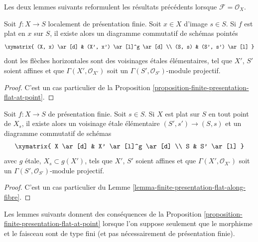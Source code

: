 \noindent
Les deux lemmes suivants reformulent les résultats
précédents lorsque $\mathcal{F} = \mathcal{O}_X$.

\begin{lemma}
\label{lemma-finite-presentation-flat-at-point-X}
Soit $f : X \to S$ localement de présentation finie.
Soit $x \in X$ d'image $s \in S$.
Si $f$ est plat en $x$ sur $S$, il existe alors un diagramme commutatif
de schémas pointés
$$
\xymatrix{
(X, x) \ar[d] & (X', x') \ar[l]^g \ar[d] \\
(S, s) & (S', s') \ar[l]
}
$$
dont les flèches horizontales sont des voisinages \'etales élémentaires,
tel que $X'$, $S'$ soient affines et que
$\Gamma(X', \mathcal{O}_{X'})$ soit un
$\Gamma(S', \mathcal{O}_{S'})$-module projectif.
\end{lemma}

\begin{proof}
C'est un cas particulier de la
Proposition \ref{proposition-finite-presentation-flat-at-point}.
\end{proof}

\begin{lemma}
\label{lemma-finite-presentation-flat-along-fibre-X}
Soit $f : X \to S$ de présentation finie.
Soit $s \in S$.
Si $X$ est plat sur $S$ en tout point de $X_s$,
il existe alors un voisinage \'etale élémentaire
$(S', s') \to (S, s)$ et un diagramme commutatif de schémas
$$
\xymatrix{
X \ar[d] & X' \ar[l]^g \ar[d] \\
S & S' \ar[l]
}
$$
avec $g$ \'etale, $X_s \subset g(X')$, tels que $X'$, $S'$
soient affines et que
$\Gamma(X', \mathcal{O}_{X'})$ soit un
$\Gamma(S', \mathcal{O}_{S'})$-module projectif.
\end{lemma}

\begin{proof}
C'est un cas particulier du
Lemme \ref{lemma-finite-presentation-flat-along-fibre}.
\end{proof}

\noindent
Les lemmes suivants donnent des conséquences de la
Proposition \ref{proposition-finite-presentation-flat-at-point}
lorsque l'on suppose seulement que le morphisme et le faisceau sont de type fini
(et pas nécessairement de présentation finie).

